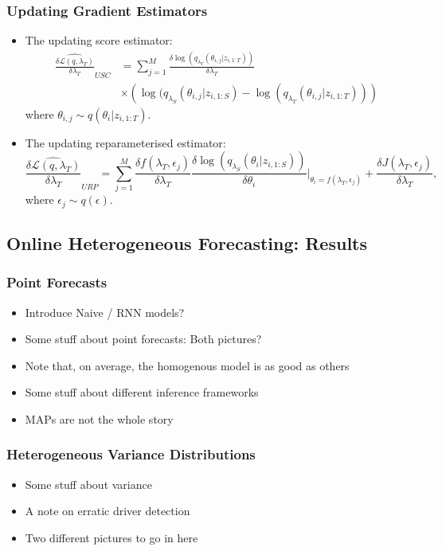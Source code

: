\documentclass[11pt]{beamer}\usepackage[]{graphicx}\usepackage[]{color}
\begin{document}
\begin{frame}
\frametitle{Updating Gradient Estimators}
\begin{itemize}
\item The updating score estimator:
\begin{align}
\widehat{\frac{\delta\mathcal{L}(q, \lambda_T)}{\delta \lambda_T}}_{USC} &= \sum_{j = 1}^M \frac{\delta \log(q_{\lambda_T}(\theta_{i, j} | z_{i, 1:T}))}{\delta \lambda_T} \nonumber \\
&\times \left(\log(q_{\lambda_S}(\theta_{i, j} | z_{i, 1:S}) - \log(q_{\lambda_T}(\theta_{i, j} | z_{i, 1:T})) \right) \label{scoreUpdate}
\end{align}
where $\theta_{i, j} \sim q(\theta_{i} | z_{i, 1:T})$. 
\item The updating reparameterised estimator:
\begin{equation}
\label{rpUpdate}
\widehat{\frac{\delta\mathcal{L}(q, \lambda_T)}{\delta \lambda_T}}_{URP} = \sum_{j = 1}^M \frac{\delta f(\lambda_T, \epsilon_j)}{\delta \lambda_T} \frac{\delta \log(q_{\lambda_S}(\theta_{i} |z_{i, 1:S}))}{\delta \theta_{i}} \bigg\rvert_{\theta_{i} = f(\lambda_T, \epsilon_j)} + \frac{\delta J(\lambda_T, \epsilon_j)}{\delta \lambda_T},
\end{equation}
where $\epsilon_j \sim q(\epsilon)$.
\end{itemize}
\end{frame}

\begin{frame}
\section{Online Heterogeneous Forecasting: Results}
\frametitle{Point Forecasts}
\begin{itemize}
\item Introduce Naive / RNN models?
\item Some stuff about point forecasts: Both pictures?
\item Note that, on average, the homogenous model is as good as others
\item Some stuff about different inference frameworks
\item MAPs are not the whole story
\end{itemize}
\end{frame}

\begin{frame}
\frametitle{Heterogeneous Variance Distributions}
\begin{itemize}
\item Some stuff about variance
\item A note on erratic driver detection
\item Two different pictures to go in here
\end{itemize}
\end{frame}
\end{document}
